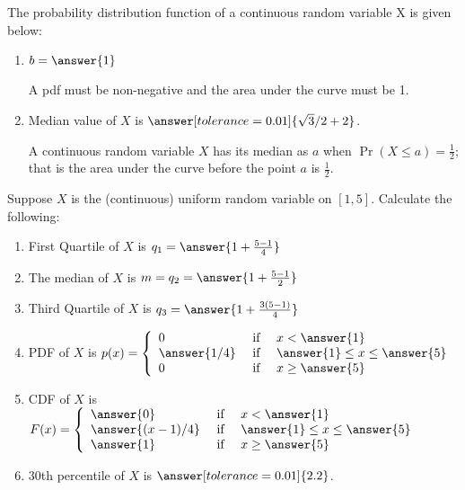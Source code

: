 \documentclass{ximera}
\begin{document}
\begin{problem}
The probability distribution function of a continuous random variable X is given below:
\begin{image}
\end{image}

\begin{enumerate}
\item $b=\answer{1}$
\begin{hint}
A pdf must be non-negative and the area under the curve must be 1.
\end{hint}

\item Median value of $X$ is $\answer[tolerance=0.01]{\sqrt{3}/2+2}$.
\begin{hint}
A continuous random variable $X$ has its median as $a$ when $\Pr(X\leq a)=\frac{1}{2}$; that is the area under the curve before the point $a$ is $\frac{1}{2}$.
\end{hint}

\end{enumerate}
\end{problem}
\begin{problem}
    Suppose $X$ is the (continuous) uniform random variable on $[1,5]$. Calculate the following:
    
    \begin{enumerate}
        \item First Quartile of $X$ is $q_1=\answer{1+\frac{5-1}{4}}$
        \item The median of $X$ is $m=q_2=\answer{1+\frac{5-1}{2}}$
        \item Third Quartile of $X$ is $q_3=\answer{1+\frac{3(5-1)}{4}}$
        \item PDF of $X$ is $p(x)=\left\{\begin{array}{lcl} 0 & \mbox{ if } & x < \answer{1}
        \\
        \answer{1/4} & \mbox{ if } & \answer{1} \leq x \leq \answer{5}
        \\
        0 & \mbox{ if } & x \geq \answer{5}
        \end{array} \right.$
        \item CDF of $X$ is $F(x)=\left\{\begin{array}{lcl} \answer{0} & \mbox{ if } & x < \answer{1}
        \\
        \answer{(x-1)/4} & \mbox{ if } & \answer{1} \leq x \leq \answer{5}
        \\
        \answer{1} & \mbox{ if } & x \geq \answer{5}
        \end{array} \right.$
        \item 30th percentile of $X$ is $\answer[tolerance=0.01]{2.2}$.
    \end{enumerate}
\end{problem}
\end{document}

